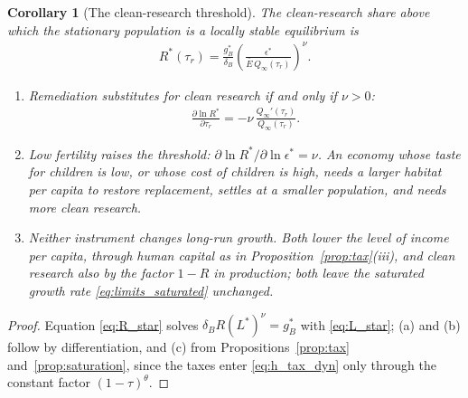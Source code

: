 \documentclass[11pt]{article}
\newtheorem{corollary}{Corollary}
\begin{document}
\begin{corollary}[The clean-research threshold]
\label{cor:threshold}
The clean-research share above which the stationary population is a locally stable equilibrium is
\begin{align}
R^\ast(\tau_r)=\frac{g_B^\ast}{\delta_B}\left(\frac{\epsilon^\ast}{\bar E\,Q_\infty(\tau_r)}\right)^{\nu}.
\label{eq:R_star}
\end{align}
\begin{enumerate}
\item[(a)] \emph{Remediation substitutes for clean research if and only if $\nu>0$:}
\begin{align*}
\frac{\partial\ln R^\ast}{\partial\tau_r}=-\nu\,\frac{Q_\infty'(\tau_r)}{Q_\infty(\tau_r)}.
\end{align*}
\item[(b)] \emph{Low fertility raises the threshold:} $\partial\ln R^\ast/\partial\ln\epsilon^\ast=\nu$. An
economy whose taste for children is low, or whose cost of children is high, needs a larger habitat per
capita to restore replacement, settles at a smaller population, and needs more clean research.
\item[(c)] \emph{Neither instrument changes long-run growth.} Both lower the level of income per capita,
through human capital as in Proposition~\ref{prop:tax}(iii), and clean research also by the factor $1-R$
in production; both leave the saturated growth rate \eqref{eq:limits_saturated} unchanged.
\end{enumerate}
\end{corollary}

\begin{proof}
Equation \eqref{eq:R_star} solves $\delta_BR(L^\ast)^{\nu}=g_B^\ast$ with \eqref{eq:L_star}; (a) and (b)
follow by differentiation, and (c) from Propositions~\ref{prop:tax} and~\ref{prop:saturation}, since the
taxes enter \eqref{eq:h_tax_dyn} only through the constant factor $(1-\tau)^{\theta}$.
\end{proof}
\end{document}
